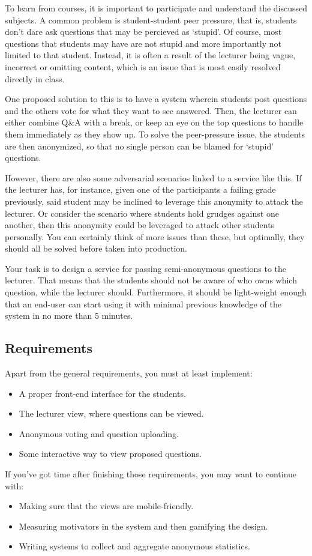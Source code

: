 To learn from courses, it is important to participate and understand the discussed subjects. A common problem is student-student peer pressure, that is, students don't dare ask questions that may be percieved as `stupid'. Of course, most questions that students may have are not stupid and more importantly not limited to that student. Instead, it is often a result of the lecturer being vague, incorrect or omitting content, which is an issue that is most easily resolved directly in class.

One proposed solution to this is to have a system wherein students post questions and the others vote for what they want to see answered. Then, the lecturer can either combine Q\&A with a break, or keep an eye on the top questions to handle them immediately as they show up. To solve the peer-pressure issue, the students are then anonymized, so that no single person can be blamed for `stupid' questions.

However, there are also some adversarial scenarios linked to a service like this. If the lecturer has, for instance, given one of the participants a failing grade previously, said student may be inclined to leverage this anonymity to attack the lecturer. Or consider the scenario where students hold grudges against one another, then this anonymity could be leveraged to attack other students personally. You can certainly think of more issues than these, but optimally, they should all be solved before taken into production.

Your task is to design a service for passing semi-anonymous questions to the lecturer. That means that the students should not be aware of who owns which question, while the lecturer should. Furthermore, it should be light-weight enough that an end-user can start using it with minimal previous knowledge of the system in no more than 5 minutes.

\subsection*{Requirements}
Apart from the general requirements, you must at least implement:
\begin{itemize}
    \item A proper front-end interface for the students.
	\item The lecturer view, where questions can be viewed.
	\item Anonymous voting and question uploading.
    \item Some interactive way to view proposed questions.
\end{itemize}
If you've got time after finishing those requirements, you may want to continue with:
\begin{itemize}
    \item Making sure that the views are mobile-friendly.
	\item Measuring motivators in the system and then gamifying the design.
	\item Writing systems to collect and aggregate anonymous statistics.
\end{itemize}

